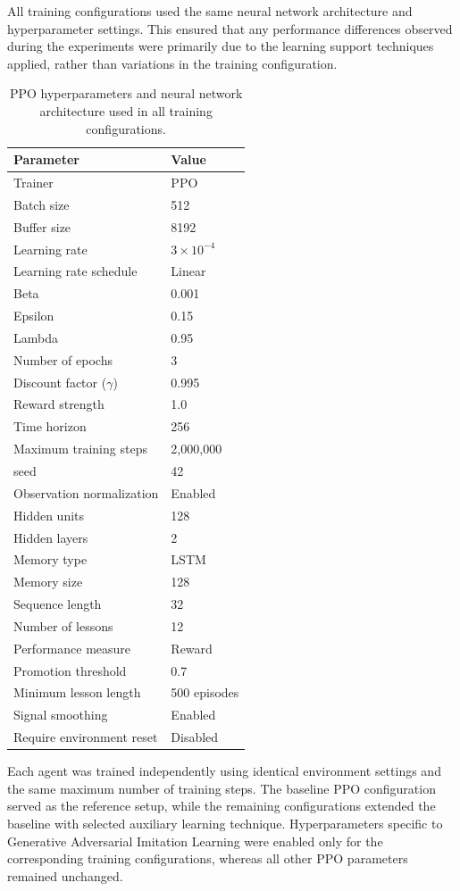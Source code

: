All training configurations used the same neural network architecture and hyperparameter settings. This ensured that any performance differences observed during the experiments were primarily due to the learning support techniques applied, rather than variations in the training configuration.
\begin{table}[H]
	\centering
	\caption{PPO hyperparameters and neural network architecture used in all training configurations.}
	\label{tab:ppo_hyperparameters}
	\begin{tabular}{ll}
		\toprule
		\textbf{Parameter} & \textbf{Value} \\
		\midrule
		Trainer & PPO \\
		Batch size & 512 \\
		Buffer size & 8192 \\
		Learning rate & $3 \times 10^{-4}$ \\
		Learning rate schedule & Linear \\
		Beta & 0.001 \\
		Epsilon & 0.15 \\
		Lambda & 0.95 \\
		Number of epochs & 3 \\
		Discount factor ($\gamma$) & 0.995 \\
		Reward strength & 1.0 \\
		Time horizon & 256 \\
		Maximum training steps & 2,000,000 \\
		seed & 42\\
		\midrule
		Observation normalization & Enabled \\
		Hidden units & 128 \\
		Hidden layers & 2 \\
		Memory type & LSTM \\
		Memory size & 128 \\
		Sequence length & 32 \\
		\midrule
		Number of lessons & 12 \\
		Performance measure & Reward \\
		Promotion threshold & 0.7 \\
		Minimum lesson length & 500 episodes \\
		Signal smoothing & Enabled \\
		Require environment reset & Disabled \\
		
		\bottomrule
	\end{tabular}
\end{table}
Each agent was trained independently using identical environment settings and the same maximum number of training steps. The baseline PPO configuration served as the reference setup, while the remaining configurations extended the baseline with selected auxiliary learning technique. Hyperparameters specific to Generative Adversarial Imitation Learning were enabled only for the corresponding training configurations, whereas all other PPO parameters remained unchanged.

